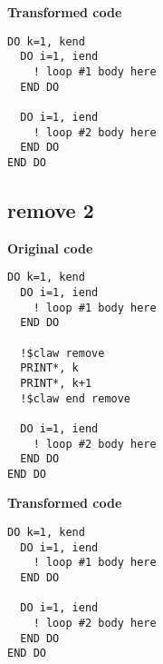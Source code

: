 \documentclass{article}
\begin{document}
\textbf{Transformed code}
\begin{lstlisting}
DO k=1, kend
  DO i=1, iend
    ! loop #1 body here
  END DO

  DO i=1, iend
    ! loop #2 body here
  END DO
END DO
\end{lstlisting}




\subsection{remove 2}
\label{remove2}

\textbf{Original code}
\begin{lstlisting}
DO k=1, kend
  DO i=1, iend
    ! loop #1 body here
  END DO

  !$claw remove
  PRINT*, k
  PRINT*, k+1
  !$claw end remove

  DO i=1, iend
    ! loop #2 body here
  END DO
END DO
\end{lstlisting}


\textbf{Transformed code}
\begin{lstlisting}
DO k=1, kend
  DO i=1, iend
    ! loop #1 body here
  END DO

  DO i=1, iend
    ! loop #2 body here
  END DO
END DO
\end{lstlisting}
\end{document}
